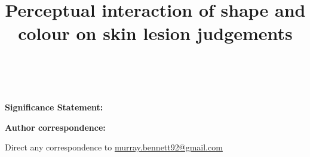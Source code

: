 \documentclass[man, 12pt, a4paper,  donotrepeattitle, floatsintext, draftfirst]{apa7}
\title{Perceptual interaction of shape and colour on skin lesion judgements}
\date{~}
\newenvironment{significance}{
    \par\textbf{Significance Statement:}
    \par
}{\par}
\newenvironment{correspondence}{
    \par\textbf{Author correspondence:}
}{\par}
\begin{document}
\maketitle
\begin{significance}

\end{significance}

\begin{correspondence}
    Direct any correspondence to \href{murray.bennett92@gmail.com}{murray.bennett92@gmail.com}
\end{correspondence}

\newpage
{}

\begin{abstract}





\end{abstract}
\end{document}
